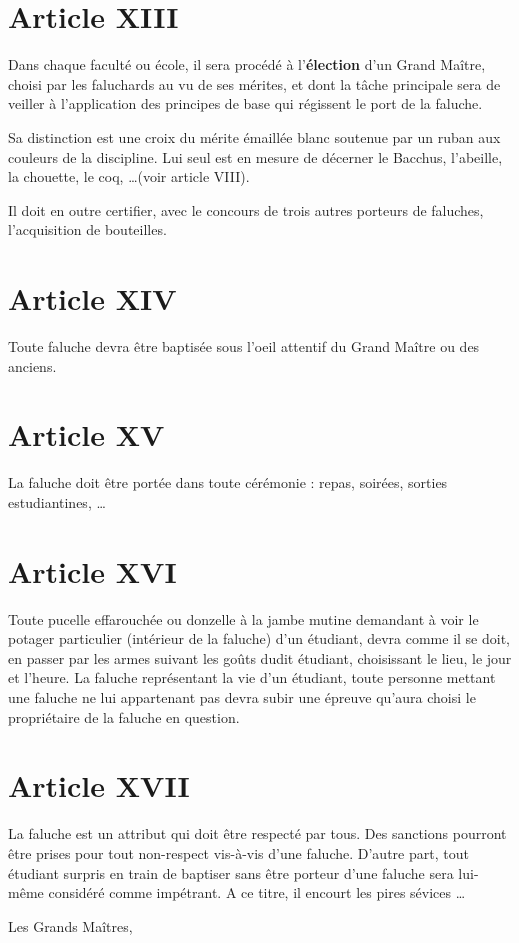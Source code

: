 \section{Article XIII}

 Dans chaque faculté ou école, il sera procédé à l'\textbf{élection} d'un Grand Maître, choisi
par les faluchards au vu de ses mérites, et dont la tâche principale sera de veiller à
l'application des principes de base qui régissent le port de la faluche.

 Sa distinction est une croix du mérite émaillée blanc soutenue par un ruban aux
couleurs de la discipline. Lui seul est en mesure de décerner le Bacchus, l'abeille, la
chouette, le coq, \ldots  (voir article VIII).

          Il doit en outre certifier, avec le concours de trois autres porteurs de faluches,
l'acquisition de bouteilles.

\section{Article XIV}
 Toute faluche devra être baptisée sous l'oeil attentif du Grand Maître ou des anciens.

\section{Article XV}
 La faluche doit être portée dans toute cérémonie : repas, soirées, sorties estudiantines, \ldots


\section{Article XVI}
 Toute pucelle effarouchée ou donzelle à la jambe mutine demandant à voir le
potager particulier (intérieur de la faluche) d'un étudiant, devra comme il se doit, en passer
par les armes suivant les goûts dudit étudiant, choisissant le lieu, le jour et l'heure.
 La faluche représentant la vie d'un étudiant, toute personne mettant une faluche
ne lui appartenant pas devra subir une épreuve qu'aura choisi le propriétaire de la faluche
en question.


\section{Article XVII}
 La faluche est un attribut qui doit être respecté par tous. Des sanctions pourront être prises 
pour tout non-respect vis-à-vis d'une faluche. D'autre part, tout étudiant surpris
en train de baptiser sans être porteur d'une faluche sera lui-même considéré comme
impétrant. A ce titre, il encourt les pires sévices \ldots
\begin{flushright}
Les Grands Maîtres,
\end{flushright}


